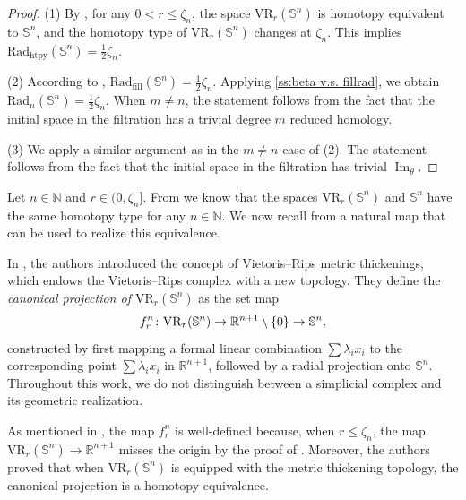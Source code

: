 \documentclass{amsart}
\makeatletter
\renewcommand\subsubsection{\@startsection{subsubsection}{3}
	\z@{.5\linespacing\@plus.7\linespacing}{0em}
	{\normalfont\itshape}}
\theoremstyle{definition}
\newcommand{\N}{\mathbb{N}}
\newcommand{\R}{\mathbb{R}}
\DeclarePairedDelimiter\set{\{}{\}}
\newcommand{\bS}{\mathbb{S}}
\newcommand{\darkblue}{\color{darkblue}}
\newcommand{\defn}[1]{{\darkblue \emph{#1}}}
\newcommand{\VR}{\mathrm{VR}}
\theoremstyle{theorem}
\DeclareMathOperator{\img}{Im}
\newcommand{\fillrad}{\mathrm{Rad}_{\mathrm{fill}}}
\newcommand{\crit}{\mathrm{Rad}_{\mathrm{htpy}}}
\newcommand{\firstdeath}[2]{\mathrm{Rad}_{#1}(#2)}
\providecommand{\DIFaddtex}[1]{{\protect\color{blue}\uwave{#1}}} %
\providecommand{\DIFdeltex}[1]{{\protect\color{red}\sout{#1}}}                      %
\providecommand{\DIFadd}[1]{\texorpdfstring{\DIFaddtex{#1}}{#1}} %
\providecommand{\DIFdel}[1]{\texorpdfstring{\DIFdeltex{#1}}{}} %
\renewcommand{\DIFadd}[1]{{\color{red}#1}}
\renewcommand{\DIFdel}[1]{{\color{deletedpurple}\ifmmode\oldmath{#1}\else\sout{#1}\fi}}
\newcommand{\oldmath}[1]{{\color{deletedpurple}\mathpalette\horizontalstrike{#1}}}
\newcommand{\horizontalstrike}[2]{\sbox0{$#1#2$}\rlap{\raisebox{.5\ht0}{\rule{\wd0}{.4pt}}}\usebox0}
\makeatother
\begin{document}
\begin{proof}
	(1) By \cite[\DIFdel{Thm.}\DIFadd{Theorem}~7.1]{lim2024vietoris}, for any $0 < r \leq \zeta_n$, the space $\VR_r(\bS^n)$ is homotopy equivalent to $\bS^n$, and the homotopy type of $\VR_r(\bS^n)$ changes at $\zeta_n$.
	This implies $\crit(\bS^n)=\frac{1}{2}\zeta_n$.

	\smallskip (2) According to \cite{katz1983filling}, \(\fillrad(\bS^n) = \frac{1}{2}\zeta_n\).
	Applying \cref{ss:beta v.s. fillrad}, we obtain \(\firstdeath{n}{\bS^n} = \frac{1}{2}\zeta_n\).
	When $m\neq n$, the statement follows from the fact that the initial space in the filtration has a trivial degree $m$ reduced homology.

	\smallskip (3) We apply a similar argument as in the $m\neq n$ case of (2). The statement follows from the fact that the initial space in the filtration has trivial $\img_\theta$.
\end{proof}

\subsubsection{}\label{ss:VRSn projection}

Let \(n \in \N\) and \(r \in (0, \zeta_n]\).
From \cite[\DIFdel{Thm.}\DIFadd{Theorem}~7.1]{lim2024vietoris} we know that the spaces \(\VR_r(\bS^n)\) and \(\bS^n\) have the same homotopy type for any \(n \in \N\).
We now recall from \cite{adamaszek2018metric} a natural map that can be used to realize this equivalence.

In \cite{adamaszek2018metric}, the authors introduced the concept of Vietoris–Rips metric thickenings, which endows the Vietoris–Rips complex with a new topology.
They define the \defn{canonical projection of \(\VR_r(\bS^n)\)} as the set map
\[
f_r^n \colon \VR_r(\bS^n) \to \R^{n+1} \setminus \set{0} \to \bS^n,
\]
constructed by first mapping a formal linear combination \(\sum \lambda_i x_i\) to the corresponding point \(\sum \lambda_i x_i\) in \(\mathbb{R}^{n+1}\), followed by a radial projection onto \(\bS^n\).
Throughout this work, we do not distinguish between a simplicial complex and its geometric realization.

As mentioned in \cite{adamaszek2018metric}, the map $f_r^n$ is well-defined because, when $r \leq \zeta_n$, the map $\VR_r(\bS^n) \to \R^{n+1}$ misses the origin by the proof of \cite[Lemma 3]{lovasz1983self}.
Moreover, the authors proved that when \(\VR_r(\bS^n)\) is equipped with the metric thickening topology, the canonical projection is a homotopy equivalence.
\end{document}
